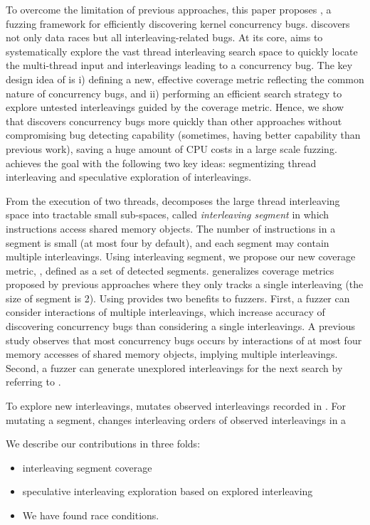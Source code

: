 To overcome the limitation of previous approaches, this paper proposes
\sys, a fuzzing framework for efficiently discovering kernel concurrency bugs. \sys discovers not only data races but all interleaving-related bugs. 
At its core, \sys aims to systematically explore the vast thread
interleaving search space to quickly locate the multi-thread input and 
interleavings leading to a concurrency bug. The key design idea of \sys 
is i) defining a new, effective coverage metric reflecting the 
common nature of concurrency bugs, and ii) performing an efficient search
strategy to explore untested interleavings guided by the coverage metric.
Hence, we show that \sys discovers concurrency bugs more quickly than 
other approaches without compromising bug detecting capability 
(sometimes, having better capability than previous work), saving a huge 
amount of CPU costs in a large scale fuzzing. \sys achieves the goal 
with the following two key ideas: segmentizing thread interleaving and speculative exploration  of interleavings.

 From the execution of two threads,  
\sys decomposes the large thread interleaving space into tractable 
small sub-spaces, called \textit{interleaving segment} in which
instructions access shared memory objects. The number of instructions 
in a segment is small (at most four by default), and each segment may 
contain multiple interleavings. Using interleaving segment, we propose 
our new coverage metric, \textit{\intcov}, defined as a set of detected segments. \Intcov generalizes coverage 
metrics proposed by previous approaches where they only tracks 
a single interleaving (the size of segment is 2). 
Using \intcov provides two benefits to fuzzers. First, a fuzzer can 
consider interactions of multiple interleavings, which increase 
accuracy of discovering concurrency bugs than considering a single 
interleavings. A previous study\cite{learningfrommistakes} observes that
most concurrency bugs occurs by interactions of at most four memory accesses of shared memory objects, implying multiple interleavings.
Second, a fuzzer can generate unexplored interleavings for the next 
search by referring to \intcov.

 To explore new interleavings,
\sys mutates observed interleavings recorded in \intcov. For mutating a segment, \sys changes interleaving orders of observed interleavings 
in a 




We describe our contributions in three folds:

\begin{itemize}
\item interleaving segment coverage
\item speculative interleaving exploration based on explored interleaving
\item We have found \totalbugs race conditions.
\end{itemize}

